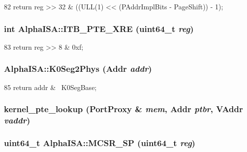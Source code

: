 \begin{DoxyCode}
82 { return reg >> 32 & ((ULL(1) << (PAddrImplBits - PageShift)) - 1); }
\end{DoxyCode}
\hypertarget{namespaceAlphaISA_ad24b14426f25156fcab0dfea1992ebff}{
\subsubsection[{ITB\_\-PTE\_\-XRE}]{\setlength{\rightskip}{0pt plus 5cm}int AlphaISA::ITB\_\-PTE\_\-XRE (uint64\_\-t {\em reg})}}
\label{namespaceAlphaISA_ad24b14426f25156fcab0dfea1992ebff}



\begin{DoxyCode}
83 { return reg >> 8 & 0xf; }
\end{DoxyCode}
\hypertarget{namespaceAlphaISA_a3429ac3cc50f87a6522ce09b611ea974}{
\subsubsection[{K0Seg2Phys}]{ AlphaISA::K0Seg2Phys ({\bf Addr} {\em addr})}}
\label{namespaceAlphaISA_a3429ac3cc50f87a6522ce09b611ea974}



\begin{DoxyCode}
85 { return addr & ~K0SegBase; }
\end{DoxyCode}
\hypertarget{namespaceAlphaISA_a3a06f643871ad1e52bbf9892022e1ff8}{
\subsubsection[{kernel\_\-pte\_\-lookup}]{ kernel\_\-pte\_\-lookup ({\bf PortProxy} \& {\em mem}, \/  {\bf Addr} {\em ptbr}, \/  VAddr {\em vaddr})}}
\label{namespaceAlphaISA_a3a06f643871ad1e52bbf9892022e1ff8}
\hypertarget{namespaceAlphaISA_a1d43dec6cc4c104201ca82a0b2a28d56}{
\subsubsection[{MCSR\_\-SP}]{\setlength{\rightskip}{0pt plus 5cm}uint64\_\-t AlphaISA::MCSR\_\-SP (uint64\_\-t {\em reg})}}
\label{namespaceAlphaISA_a1d43dec6cc4c104201ca82a0b2a28d56}



